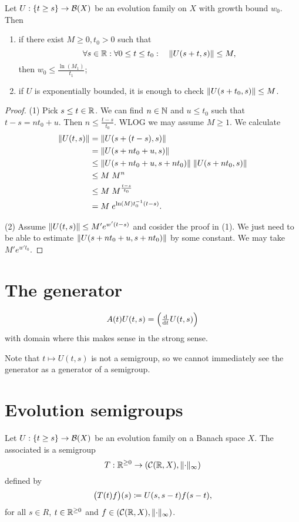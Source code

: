 \begin{proposition}
Let $U: \{t\geq s\}\to \operatorname{\mathcal{B}}(X)$ be an evolution family on $X$ with growth bound $w_0$. Then
\begin{enumerate}
\item if there exist $M\geq 0, t_0>0$ such that
\[ \forall s\in\mathbb{R}: \forall 0\leq t \leq t_0: \quad \lVert U(s+t, s)\rVert\leq M, \]
then $w_0\leq \frac{\ln(M_1)}{t_1}$;
\item if $U$ is exponentially bounded, it is enough to check $\lVert U(s+t_0, s)\rVert\leq M$.
\end{enumerate}
\end{proposition}
\begin{proof}
(1) Pick $s\leq t \in \mathbb{R}$. We can find $n\in \mathbb{N}$ and $u\leq t_0$ such that $t-s = nt_0 + u$. Then $n\leq \frac{t-s}{t_0}$. WLOG we may assume $M\geq 1$. We calculate
\begin{align*}
\lVert U(t,s)\rVert &= \lVert U(s+(t-s), s)\rVert \\
&= \lVert U(s+nt_0 + u, s)\rVert \\
&\leq \lVert U(s+nt_0 + u, s+nt_0)\rVert\;\lVert U(s+nt_0, s)\rVert \\
&\leq M\;M^n \\
&\leq M\;M^{\frac{t-s}{t_0}} \\
&= M\;e^{\ln(M)t_0^{-1}(t-s)}.
\end{align*}

(2) Assume $\lVert U(t,s)\rVert \leq M' e^{w'(t-s)}$ and cosider the proof in (1). We just need to be able to estimate $\lVert U(s+nt_0 + u, s+nt_0)\rVert$ by some constant. We may take $M' e^{w't_0}$.
\end{proof}

\section{The generator}
\begin{definition}
\[ A(t)U(t,s) = \Big(\od{}{t}U(t,s)\Big) \]
with domain where this makes sense in the strong sense.
\end{definition}
Note that $t\mapsto U(t,s)$ is not a semigroup, so we cannot immediately see the generator as a generator of a semigroup.

\begin{proposition}

\end{proposition}

\section{Evolution semigroups}
\begin{definition}
Let $U: \{t\geq s\}\to \operatorname{\mathcal{B}}(X)$ be an evolution family on a Banach space $X$. The associated  is a semigroup
\[ T: \R^{\geq 0} \to \sSet{\cont(\R, X), \norm{\cdot}_\infty} \]
defined by
\[ \big(T(t)f\big)(s) \coloneqq U(s,s-t)f(s-t), \]
for all $s\in R$, $t\in\mathbb{R}^{\geq 0}$ and $f\in \sSet{\cont(\R, X), \norm{\cdot}_\infty}$.
\end{definition}

